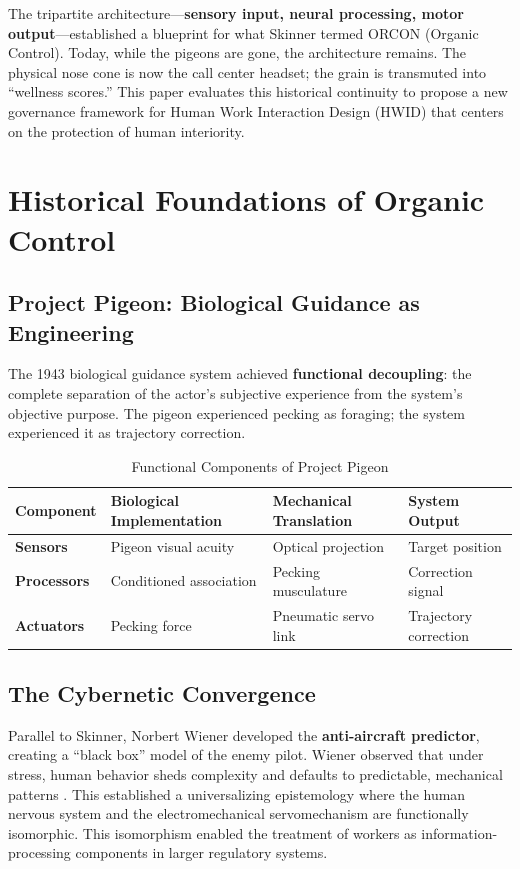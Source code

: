 \documentclass[11pt, a4paper]{article}
\begin{document}
The tripartite architecture—\textbf{sensory input, neural processing, motor output}—established a blueprint for what Skinner termed ORCON (Organic Control). Today, while the pigeons are gone, the architecture remains. The physical nose cone is now the call center headset; the grain is transmuted into ``wellness scores.'' This paper evaluates this historical continuity to propose a new governance framework for Human Work Interaction Design (HWID) that centers on the protection of human interiority.

\section{Historical Foundations of Organic Control}

\subsection{Project Pigeon: Biological Guidance as Engineering}
The 1943 biological guidance system achieved \textbf{functional decoupling}: the complete separation of the actor's subjective experience from the system's objective purpose. The pigeon experienced pecking as foraging; the system experienced it as trajectory correction.

\begin{table}[h]
\centering
\caption{Functional Components of Project Pigeon}
\label{tab:pigeon_components}
\begin{tabular}{@{}llll@{}}
\toprule
\textbf{Component} & \textbf{Biological Implementation} & \textbf{Mechanical Translation} & \textbf{System Output} \\ \midrule
\textbf{Sensors} & Pigeon visual acuity & Optical projection & Target position \\
\textbf{Processors} & Conditioned association & Pecking musculature & Correction signal \\
\textbf{Actuators} & Pecking force & Pneumatic servo link & Trajectory correction \\ \bottomrule
\end{tabular}
\end{table}

\subsection{The Cybernetic Convergence}
Parallel to Skinner, Norbert Wiener developed the \textbf{anti-aircraft predictor}, creating a ``black box'' model of the enemy pilot. Wiener observed that under stress, human behavior sheds complexity and defaults to predictable, mechanical patterns \cite{wiener1948cybernetics}. This established a universalizing epistemology where the human nervous system and the electromechanical servomechanism are functionally isomorphic. This isomorphism enabled the treatment of workers as information-processing components in larger regulatory systems.
\end{document}
